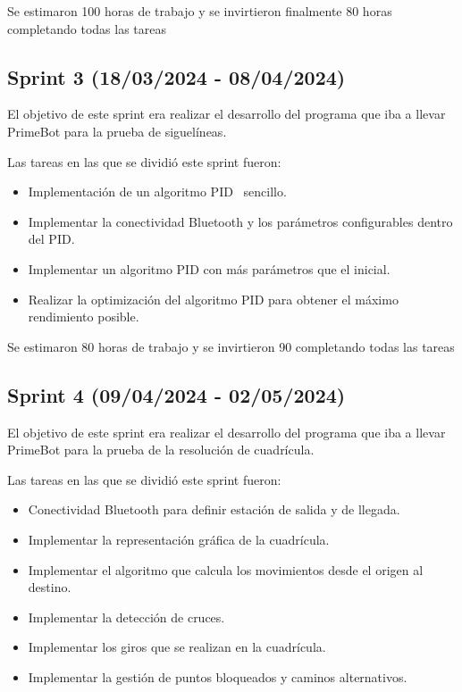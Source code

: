Se estimaron 100 horas de trabajo y se invirtieron finalmente 80 horas completando todas las tareas
 
 \subsection {Sprint 3 (18/03/2024 - 08/04/2024)}
 
 El objetivo de este sprint era realizar el desarrollo del programa que iba a llevar PrimeBot para la prueba de siguelíneas.
 
 Las tareas en las que se dividió este sprint fueron:
 \begin{itemize}
\tightlist
\item
  Implementación de un algoritmo PID ~\cite{ogata2010}sencillo.
\item
  Implementar la conectividad Bluetooth y los parámetros configurables dentro del PID.
\item
  Implementar un algoritmo PID con más parámetros que el inicial.
  \item
  Realizar la optimización del algoritmo PID para obtener el máximo rendimiento posible.
\end{itemize}

Se estimaron 80 horas de trabajo y se invirtieron 90 completando todas las tareas
 
 \subsection {Sprint 4 (09/04/2024 - 02/05/2024)}
  El objetivo de este sprint era realizar el desarrollo del programa que iba a llevar PrimeBot para la prueba de la resolución de cuadrícula.
  
   Las tareas en las que se dividió este sprint fueron:
 \begin{itemize}
\tightlist
\item
  Conectividad Bluetooth para definir estación de salida y de llegada.
\item
  Implementar la representación gráfica de la cuadrícula.
\item
  Implementar el algoritmo que calcula los movimientos desde el origen al destino.
  \item
  Implementar la detección de cruces.
    \item
  Implementar los giros que se realizan en la cuadrícula.
      \item
  Implementar la gestión de puntos bloqueados y caminos alternativos.
\end{itemize}

